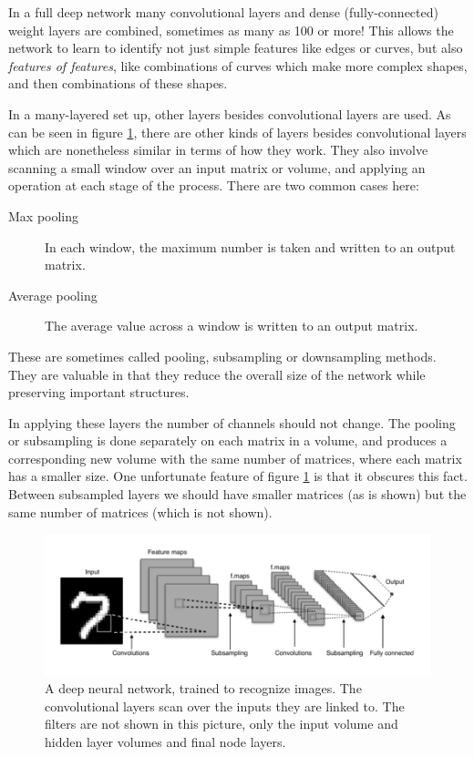 In a full deep network many convolutional layers and dense (fully-connected) weight layers are combined, sometimes as many as 100 or more! This allows the network to learn to identify not just simple features like edges or curves, but also \emph{features of features}, like combinations of curves which make more complex shapes, and then combinations of these shapes. 

In a many-layered set up, other layers besides convolutional layers are used. As can be seen in figure \ref{deep_net2}, there are other kinds of layers besides convolutional layers which are nonetheless similar in terms of how they work.  They also involve scanning a small window over an input matrix or volume, and applying an operation at each stage of the process. There are two common cases here:

\begin{description}
\item[Max pooling] In each window, the maximum number is taken and written to an output matrix.
\item[Average pooling] The average value across a window is written to an output matrix.
\end{description}

These are sometimes called pooling, subsampling or downsampling methods. They are valuable in that they reduce the overall size of the network while preserving important structures.

In applying these layers the number of channels should not change. The pooling or subsampling is done separately on each matrix in a volume, and produces a corresponding new volume with the same number of matrices, where each matrix has a smaller size. One unfortunate feature of figure \ref{deep_net2} is that it obscures this fact. Between subsampled layers we should have smaller matrices (as is shown) but the same number of matrices (which is not shown).

\begin{figure}[h]
\centering
\includegraphics[scale=.45]{./images/deepNet.png}
\caption[Adapted from a creative commons image by Aphex34 at \url{https://commons.wikimedia.org/wiki/File:Typical_cnn.png} ]{A deep neural network, trained to recognize images. The convolutional layers scan over the inputs they are linked to. The filters are not shown in this picture, only the input volume and hidden layer volumes and final node layers. }
\label{deep_net2}
\end{figure}


